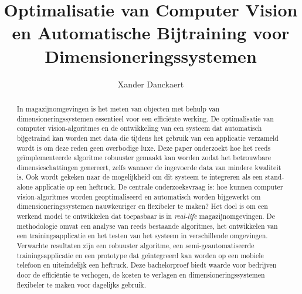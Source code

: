 \documentclass{hogent-article}
\title{Optimalisatie van Computer Vision en Automatische Bijtraining voor Dimensioneringssystemen}
\author{Xander Danckaert}
\begin{document}
\begin{abstract}
  In magazijnomgevingen is het meten van objecten met behulp van dimensioneringssystemen essentieel voor een efficiënte werking. De optimalisatie van computer vision-algoritmes en de ontwikkeling van een systeem dat automatisch bijgetraind kan worden met data die tijdens het gebruik van een applicatie verzameld wordt is om deze reden geen overbodige luxe. Deze paper onderzoekt hoe het reeds geïmplementeerde algoritme robuuster gemaakt kan worden zodat het betrouwbare dimensieschattingen genereert, zelfs wanneer de ingevoerde data van mindere kwaliteit is. Ook wordt gekeken naar de mogelijkheid om dit systeem te integreren als een stand-alone applicatie op een heftruck. De centrale onderzoeksvraag is: hoe kunnen computer vision-algoritmes worden geoptimaliseerd en automatisch worden bijgewerkt om dimensioneringssystemen nauwkeuriger en flexibeler te maken? Het doel is om een werkend model te ontwikkelen dat toepasbaar is in \textit{real-life} magazijnomgevingen. De methodologie omvat een analyse van reeds bestaande algoritmes, het ontwikkelen van een trainingsapplicatie en het testen van het systeem in verschillende omgevingen. Verwachte resultaten zijn een robuuster algoritme, een semi-geautomatiseerde trainingsapplicatie en een prototype dat geïntegreerd kan worden op een mobiele telefoon en uiteindelijk een heftruck. Deze bachelorproef biedt waarde voor bedrijven door de efficiëntie te verhogen, de kosten te verlagen en dimensioneringssystemen flexibeler te maken voor dagelijks gebruik.
  
\end{abstract}
\tableofcontents



\printbibliography[heading=bibintoc]
\end{document}
